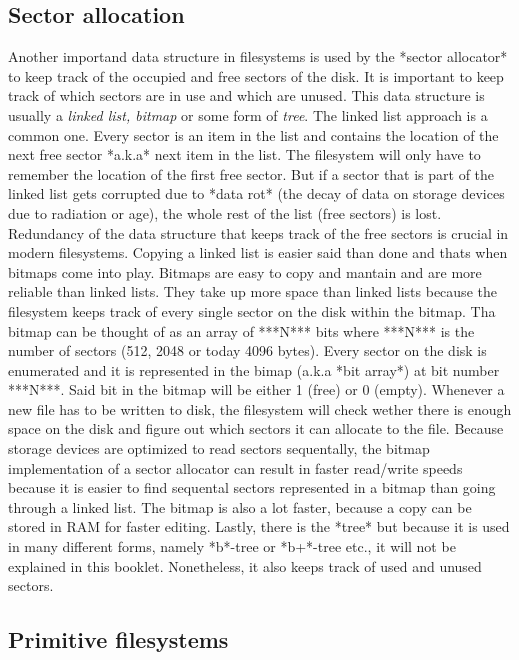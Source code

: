 \subsection{Sector allocation}

Another importand data structure in filesystems is used by the *sector allocator* to keep track of the
occupied and free sectors of the disk. It is important to keep track of which sectors are in use and
which are unused. This data structure is usually a \textit{linked list, bitmap} or some form of \textit{tree}. The
linked list approach is a common one. Every sector is an item in the list and contains the location of
the next free sector *a.k.a* next item in the list. The filesystem will only have to remember the
location of the first free sector. But if a sector that is part of the linked list gets corrupted due
to *data rot* (the decay of data on storage devices due to radiation or age), the whole rest of the
list (free sectors) is lost. Redundancy of the data structure that keeps track of the free sectors is
crucial in modern filesystems. Copying a linked list is easier said than done and thats when bitmaps
come into play. Bitmaps are easy to copy and mantain and are more reliable than linked lists. They
take up more space than linked lists because the filesystem keeps track of every single sector on the
disk within the bitmap. Tha bitmap can be thought of as an array of ***N*** bits where ***N*** is the
number of sectors (512, 2048 or today 4096 bytes). Every sector on the disk is enumerated and it is
represented in the bimap (a.k.a *bit array*) at bit number ***N***. Said bit in the bitmap will be
either 1 (free) or 0 (empty). Whenever a new file has to be written to disk, the filesystem will check
wether there is enough space on the disk and figure out which sectors it can allocate to the file.
Because storage devices are optimized to read sectors sequentally, the bitmap implementation of a
sector allocator can result in faster read/write speeds because it is easier to find sequental sectors
represented in a bitmap than going through a linked list. The bitmap is also a lot faster, because a
copy can be stored in RAM for faster editing. Lastly, there is the *tree* but because it is used in
many different forms, namely *b*-tree or *b+*-tree etc., it will not be explained in this booklet.
Nonetheless, it also keeps track of used and unused sectors.

\subsection{Primitive filesystems}

